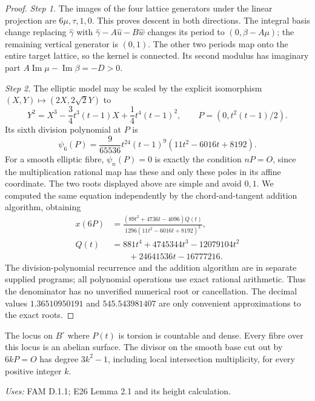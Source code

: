 \begin{proof}
\par\noindent\textit{Step 1.} The images of the four lattice generators under the linear projection
are \(6\mu,\tau,1,0\). This proves descent in both directions.
The integral basis change replacing \(\widehat\gamma\) with
\(\widehat\gamma-A\widehat u-B\widehat w\) changes its period to
\((0,\beta-A\mu)\); the remaining vertical generator is \((0,1)\).
The other two periods map onto the entire target lattice, so the kernel
is connected. Its second modulus has imaginary part
\(A\operatorname{Im}\mu-\operatorname{Im}\beta=-D>0\).

\par\noindent\textit{Step 2.} The elliptic model may be scaled by the explicit isomorphism
\((X,Y)\mapsto(2X,2\sqrt2Y)\) to
\[
 Y^2=X^3-\frac34t^3(t-1)X+\frac14t^4(t-1)^2,
 \qquad P=(0,t^2(t-1)/2).
\]
Its sixth division polynomial at \(P\) is
\[
 \psi_6(P)=\frac9{65536}t^{24}(t-1)^9
 (11t^2-6016t+8192).
\]
For a smooth elliptic fibre, \(\psi_n(P)=0\) is exactly the condition
\(nP=O\), since the multiplication rational map has these and only these
poles in its affine coordinate. The two roots displayed above are simple
and avoid \(0,1\). We computed the same equation independently by the
chord-and-tangent addition algorithm, obtaining
\[
 \begin{aligned}
 x(6P)&=\frac{(89t^2+4736t-4096)Q(t)}
 {1296(11t^2-6016t+8192)^2},\\
 Q(t)&=881t^4+4745344t^3-12079104t^2\\
 &\hspace{2em}+24641536t-16777216.
 \end{aligned}
\]
The division-polynomial recurrence and the addition algorithm are in
separate supplied programs; all polynomial operations use exact rational
arithmetic. Thus the denominator has no unverified numerical root or
cancellation. The decimal values \(1.36510950191\) and
\(545.543981407\) are only convenient approximations to the exact roots.
\end{proof}

\begin{proposition}[FAM D.1.2; T]\label{fam:D.1.2}
The locus on \(B^\circ\) where \(P(t)\) is torsion is countable and dense.
Every fibre over this locus is an abelian surface. The divisor on the
smooth base cut out by \(6kP=O\) has degree \(3k^2-1\), including local
intersection multiplicity, for every positive integer \(k\).
\end{proposition}
\noindent\emph{Uses:} FAM D.1.1; E26 Lemma 2.1 and its height calculation.\par

